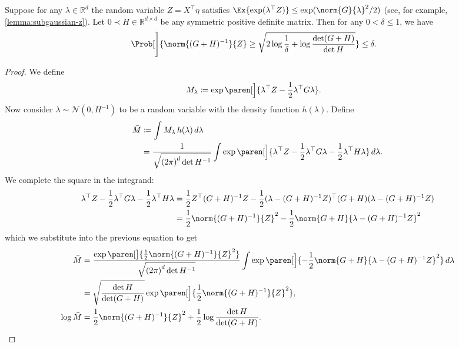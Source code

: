 \documentclass{article}
\newcommand{\defeq}{\coloneq}
\newcommand{\inv}[1]{#1^{-1}}
\newcommand{\Real}{\mathds{R}}
\renewcommand{\det}{\operatorname{det}}
\DeclarePairedDelimiter{\paren}()
\providecommand\transp{\top}
\let\transpsymbol\transp
\renewcommand{\transp}[1]{#1^\transpsymbol}
\begin{document}
\begin{lemma}\label{lemma:z-norm-bounded-whp}
  Suppose for any $\lambda\in\Real^d$ the random variable
  $Z=\transp{X}\eta$ satisfies
  $\Ex{\exp(\transp{\lambda}Z)} \le \exp(\norm{G}{\lambda}^2/2)$ (see,
  for example, \cref{lemma:subgaussian-z}).  Let
  $0 \prec H \in \Real^{d\times d}$ be any symmetric positive definite
  matrix.  Then for any $0 < \delta \le 1$, we have
  \begin{align*}
    \Prob[\Bigg]{\norm{\inv{(G+H)}}{Z} \ge \sqrt{2\log\frac{1}{\delta} + \log\frac{\det(G+H)}{\det H}}} &\le \delta.
  \end{align*}

  \begin{proof}
    We define
    \begin{align*}
      M_\lambda &\defeq \exp\paren[\Big]{\transp{\lambda}Z - \frac{1}{2}\transp{\lambda}G\lambda}.
    \end{align*}
    Now consider $\lambda\sim\mathcal{N}(0, \inv{H})$ to be a random
    variable with the density function $h(\lambda)$.  Define
    \begin{align*}
      \bar{M}
      &\defeq \int M_\lambda \,h(\lambda)\,d\lambda \\
      &= \frac{1}{\sqrt{{(2\pi)}^d \det\inv{H}}} \int\exp\paren[\Big]{\transp{\lambda}Z
        - \frac{1}{2}\transp{\lambda}G\lambda
        - \frac{1}{2}\transp{\lambda}H\lambda
        } \,d\lambda.
    \end{align*}
    We complete the square in the integrand:
    \begin{align*}
      \transp{\lambda}Z - \frac{1}{2}\transp{\lambda}G\lambda - \frac{1}{2}\transp{\lambda}H\lambda
      &= \frac{1}{2}\transp{Z}\inv{(G+H)}Z - \frac{1}{2}\transp{(\lambda - \inv{(G+H)}Z)}(G+H)(\lambda-\inv{(G+H)}Z) \\
      &= \frac{1}{2} \norm{\inv{(G+H)}}{Z}^2 - \frac{1}{2}\norm{G+H}{\lambda-\inv{(G+H)}Z}^2
    \end{align*}
    which we substitute into the previous equation to get
    \begin{align*}
      \bar{M}
      &= \frac{\exp\paren[\big]{\frac{1}{2} \norm{\inv{(G+H)}}{Z}^2}}{\sqrt{{(2\pi)}^d \det\inv{H}}}
        \int \exp\paren[\Big]{-\frac{1}{2} \norm{G+H}{\lambda-\inv{(G+H)}Z}^2} \,d\lambda \\
      &= \sqrt{\frac{\det H}{\det(G+H)}} \exp\paren[\Big]{\frac{1}{2}\norm{\inv{(G+H)}}{Z}^2}, \\
      \log\bar{M} &= \frac{1}{2}\norm{\inv{(G+H)}}{Z}^2 + \frac{1}{2}\log\frac{\det H}{\det(G+H)}.

\end{align*}
\end{proof}
\end{lemma}
\end{document}
